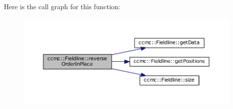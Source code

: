Here is the call graph for this function\-:\nopagebreak
\begin{figure}[H]
\begin{center}
\leavevmode
\includegraphics[width=350pt]{classccmc_1_1_fieldline_a700a5c623e608f3cbc89455bc4e63b83_cgraph}
\end{center}
\end{figure}


